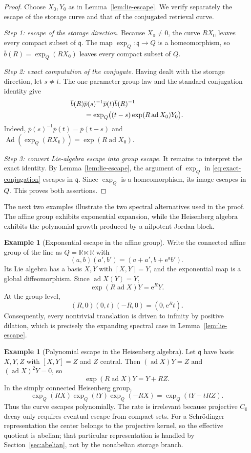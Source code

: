 \documentclass[reqno]{amsart}
\numberwithin{equation}{section}
\theoremstyle{definition}
\newtheorem{example}[theorem]{Example}
\theoremstyle{remark}
\newcommand{\R}{\mathbb R}
\newcommand{\Ad}{\operatorname{Ad}}
\newcommand{\ad}{\operatorname{ad}}
\newcommand{\e}{\mathrm e}
\newcommand{\Step}[1]{\par\medskip\noindent\textit{#1.}\quad}
\begin{document}
\begin{proof}
Choose $X_0,Y_0$ as in Lemma~\ref{lem:lie-escape}.  We verify separately the
escape of the storage curve and that of the conjugated retrieval curve.

\Step{Step 1: escape of the storage direction}
Because $X_0\neq0$, the curve $RX_0$ leaves every compact subset of
$\mathfrak q$.  The map $\exp_Q:\mathfrak q\to Q$ is a homeomorphism, so
$\overline b(R)=\exp_Q(RX_0)$ leaves every compact subset of $Q$.

\Step{Step 2: exact computation of the conjugate}
Having dealt with the storage direction, let $s\neq t$.  The one-parameter
group law and the standard conjugation
identity give
\begin{align}\label{eq:exact-conjugation}
 &\overline b(R)\overline p(s)^{-1}\overline p(t)
   \overline b(R)^{-1}\notag\\
 &\qquad
 =\exp_Q\bigl((t-s)\exp(R\ad X_0)Y_0\bigr).
\end{align}
Indeed, $\overline p(s)^{-1}\overline p(t)=\overline p(t-s)$ and
$\Ad(\exp_Q(RX_0))=\exp(R\ad X_0)$.

\Step{Step 3: convert Lie-algebra escape into group escape}
It remains to interpret the exact identity.  By
Lemma~\ref{lem:lie-escape}, the argument of $\exp_Q$ in
\eqref{eq:exact-conjugation} escapes in $\mathfrak q$.  Since $\exp_Q$ is a
homeomorphism, its image escapes in $Q$.  This proves both assertions.
\end{proof}

The next two examples illustrate the two spectral alternatives used in the
proof.  The affine group exhibits exponential expansion, while the
Heisenberg algebra exhibits the polynomial growth produced by a nilpotent
Jordan block.

\begin{example}[Exponential escape in the affine group]
\label{ex:affine-escape}
Write the connected affine group of the line as $Q=\R\ltimes\R$ with
\[
 (a,b)(a',b')=(a+a',b+\e^a b').
\]
Its Lie algebra has a basis $X,Y$ with $[X,Y]=Y$, and the exponential map is
a global diffeomorphism.  Since $\ad X(Y)=Y$,
\[
 \exp(R\ad X)Y=\e^R Y.
\]
At the group level,
\[
 (R,0)(0,t)(-R,0)=(0,\e^Rt).
\]
Consequently, every nontrivial translation is driven to infinity by positive
dilation, which is precisely the expanding spectral case in
Lemma~\ref{lem:lie-escape}.
\end{example}

\begin{example}[Polynomial escape in the Heisenberg algebra]
\label{ex:nilpotent-escape}
Let $\mathfrak q$ have basis $X,Y,Z$ with $[X,Y]=Z$ and $Z$ central.  Then
$(\ad X)Y=Z$ and $(\ad X)^2Y=0$, so
\[
 \exp(R\ad X)Y=Y+RZ.
\]
In the simply connected Heisenberg group,
\[
 \exp_Q(RX)\exp_Q(tY)\exp_Q(-RX)
 =\exp_Q(tY+tRZ).
\]
Thus the curve escapes polynomially.  The rate is irrelevant because
projective $C_0$
decay only requires eventual escape from compact sets.  For a Schr\"odinger
representation the center belongs to the projective kernel, so the effective
quotient is abelian; that particular representation is handled by
Section~\ref{sec:abelian}, not by the nonabelian storage branch.
\end{example}
\end{document}
